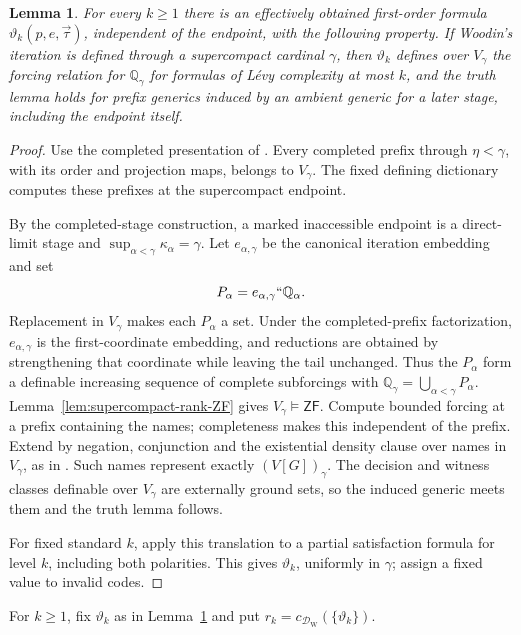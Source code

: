 \documentclass[11pt,a4paper]{amsart}
\newcommand{\ZF}{\mathsf{ZF}}
\theoremstyle{plain}
\newtheorem{lemma}[theorem]{Lemma}
\theoremstyle{definition}
\theoremstyle{remark}
\begin{document}
\begin{lemma}\label{lem:Woodin-endpoint-forcing}
{For every $k\geq1$ there is an effectively obtained first-order formula $\vartheta_k(p,e,\vec\tau)$, independent of the endpoint, with the following property.  If Woodin's iteration is defined through a supercompact cardinal $\gamma$, then $\vartheta_k$ defines over $V_\gamma$ the forcing relation for $\mathbb Q_\gamma$ for formulas of L\'evy complexity at most $k$, and the truth lemma holds for prefix generics induced by an ambient generic for a later stage, including the endpoint itself.}
\end{lemma}

\begin{proof}
\begingroup

Use the completed presentation of \cite[Section~3.1]{Supplement}.  Every completed prefix through $\eta<\gamma$, with its order and projection maps, belongs to $V_\gamma$.  The fixed defining dictionary computes these prefixes at the supercompact endpoint.

By the completed-stage construction, a marked inaccessible endpoint is a direct-limit stage and $\sup_{\alpha<\gamma}\kappa_\alpha=\gamma$.  Let $e_{\alpha,\gamma}$ be the canonical iteration embedding and set
\[
P_\alpha=e_{\alpha,\gamma}``\mathbb Q_\alpha.
\]
Replacement in $V_\gamma$ makes each $P_\alpha$ a set.  Under the completed-prefix factorization, $e_{\alpha,\gamma}$ is the first-coordinate embedding, and reductions are obtained by strengthening that coordinate while leaving the tail unchanged.  Thus the $P_\alpha$ form a definable increasing sequence of complete subforcings with
$\mathbb Q_\gamma=\bigcup_{\alpha<\gamma}P_\alpha$.  Lemma~\ref{lem:supercompact-rank-ZF} gives $V_\gamma\models\ZF$.  Compute bounded forcing at a prefix containing the names; completeness makes this independent of the prefix.  Extend by negation, conjunction and the existential density clause over names in $V_\gamma$, as in \cite[Section~3.3]{Supplement}.  Such names represent exactly $(V[G])_\gamma$.  The decision and witness classes definable over $V_\gamma$ are externally ground sets, so the induced generic meets them and the truth lemma follows.

For fixed standard $k$, apply this translation to a partial satisfaction formula for level $k$, including both polarities.  This gives $\vartheta_k$, uniformly in $\gamma$; assign a fixed value to invalid codes.
\endgroup
\end{proof}

{For $k\geq1$, fix $\vartheta_k$ as in Lemma~\ref{lem:Woodin-endpoint-forcing} and put $r_k=c_{\mathcal D_{\mathrm W}}(\{\vartheta_k\})$.}
\end{document}
